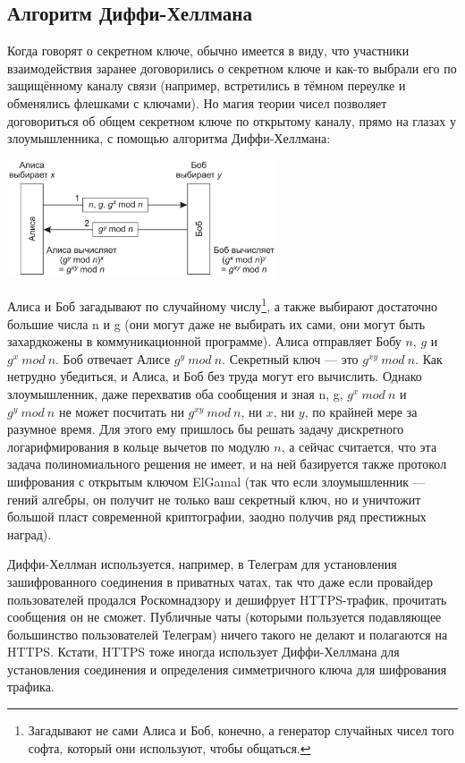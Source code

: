 \documentclass{../../text-style}
\begin{document}
\subsection{Алгоритм Диффи-Хеллмана}

Когда говорят о секретном ключе, обычно имеется в виду, что участники взаимодействия заранее договорились о секретном ключе и как-то выбрали его по защищённому каналу связи (например, встретились в тёмном переулке и обменялись флешками с ключами). Но магия теории чисел позволяет договориться об общем секретном ключе по открытому каналу, прямо на глазах у злоумышленника, с помощью алгоритма Диффи-Хеллмана:

\begin{center}
    \includegraphics[width=0.6\textwidth]{diffieHellman.png}
\end{center}

Алиса и Боб загадывают по случайному числу\footnote{Загадывают не сами Алиса и Боб, конечно, а генератор случайных чисел того софта, который они используют, чтобы общаться.}, а также выбирают достаточно большие числа n и g (они могут даже не выбирать их сами, они могут быть захардкожены в коммуникационной программе). Алиса отправляет Бобу $n$, $g$ и $g^x\ mod\ n$. Боб отвечает Алисе $g^y\ mod\ n$. Секретный ключ --- это $g^{xy}\ mod\ n$. Как нетрудно убедиться, и Алиса, и Боб без труда могут его вычислить. Однако злоумышленник, даже перехватив оба сообщения и зная n, g, $g^x\ mod\ n$ и $g^y\ mod\ n$ не может посчитать ни $g^{xy}\ mod\ n$, ни $x$, ни $y$, по крайней мере за разумное время. Для этого ему пришлось бы решать задачу дискретного логарифмирования в кольце вычетов по модулю $n$, а сейчас считается, что эта задача полиномиального решения не имеет, и на ней базируется также протокол шифрования с открытым ключом ElGamal (так что если злоумышленник --- гений алгебры, он получит не только ваш секретный ключ, но и уничтожит большой пласт современной криптографии, заодно получив ряд престижных наград).

Диффи-Хеллман используется, например, в Телеграм для установления зашифрованного соединения в приватных чатах, так что даже если провайдер пользователей продался Роскомнадзору и дешифрует HTTPS-трафик, прочитать сообщения он не сможет. Публичные чаты (которыми пользуется подавляющее большинство пользователей Телеграм) ничего такого не делают и полагаются на HTTPS. Кстати, HTTPS тоже иногда использует Диффи-Хеллмана для установления соединения и определения симметричного ключа для шифрования трафика.
\end{document}
